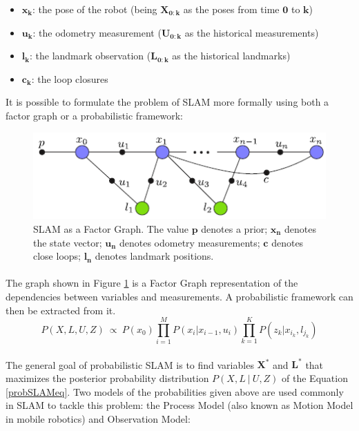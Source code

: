\documentclass[11pt]{article}
\begin{document}
	\begin{itemize}
		\item $\mathbf{x_k}$: the pose of the robot (being $\mathbf{X_{0:k}}$ as the poses from time $\mathbf{0}$ to $\mathbf{k}$)
		\item $\mathbf{u_k}$: the odometry measurement ($\mathbf{U_{0:k}}$ as the historical measurements)
		\item $\mathbf{l_k}$: the landmark observation ($\mathbf{L_{0:k}}$ as the historical landmarks)
		\item $\mathbf{c_k}$: the loop closures
	\end{itemize}

	It is possible to formulate the problem of SLAM more formally using both a factor graph or a probabilistic framework:

	\begin{figure}[h]
		\centering
		\includegraphics{SLAMFactorGraph.png}
		\caption{SLAM as a Factor Graph. The value $\mathbf{p}$ denotes a prior; $\mathbf{x_n}$ denotes the state vector; $\mathbf{u_n}$ denotes odometry measurements; $\mathbf{c}$ denotes close loops; $\mathbf{l_n}$ denotes landmark positions.}
		\label{fig:slam1}
	\end{figure}
	
	\paragraph{}
	The graph shown in Figure \ref{fig:slam1} is a Factor Graph representation of the dependencies between variables and measurements. A probabilistic framework can then be extracted from it. 
	\begin{equation}
	P(X,L,U,Z)\ \propto \ P(x_0)\prod_{i=1}^{M}P(x_i|x_{i-1}, u_i)\prod_{k=1}^{K}P(z_k|x_{i_k},l_{j_k})
	\label{probSLAMeq}
	\end{equation}
	\paragraph{}
	The general goal of probabilistic SLAM is to find variables $\mathbf{X^*}$ and $\mathbf{L^*}$ that maximizes the posterior probability distribution $P(X,L\ |\ U, Z)$ of the Equation \ref{probSLAMeq}. Two models of the probabilities given above are used commonly in SLAM to tackle this problem: the Process Model (also known as Motion Model in mobile robotics) and Observation Model:
	
\end{document}
